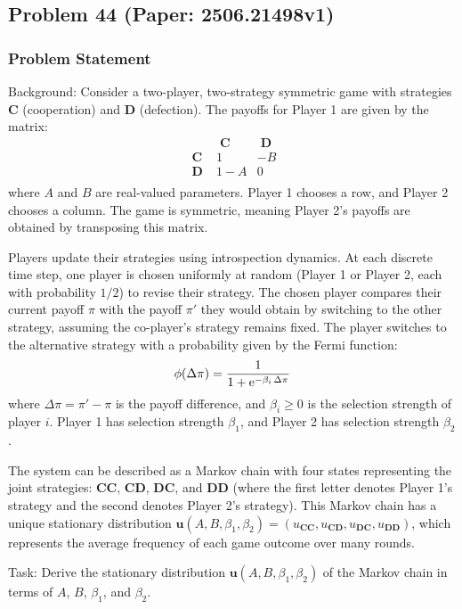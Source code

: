 \documentclass[10pt]{article}
\begin{document}
\subsection*{Problem 44 (Paper: 2506.21498v1)}
\subsubsection*{Problem Statement}
Background:
Consider a two-player, two-strategy symmetric game with strategies $\mathbf{C}$ (cooperation) and $\mathbf{D}$ (defection). The payoffs for Player 1 are given by the matrix:
$$
	\begin{array}{c|cc}
		&\mathbf{\;C\;} &\mathbf{\;D\;}\\
		\hline
		\mathbf{\;C\;} &1 &-B \\
		\mathbf{\;D\;} &1-A &0 \\
	\end{array}
$$
where $A$ and $B$ are real-valued parameters. Player 1 chooses a row, and Player 2 chooses a column. The game is symmetric, meaning Player 2's payoffs are obtained by transposing this matrix.

Players update their strategies using introspection dynamics. At each discrete time step, one player is chosen uniformly at random (Player 1 or Player 2, each with probability $1/2$) to revise their strategy. The chosen player compares their current payoff $\pi$ with the payoff $\pi'$ they would obtain by switching to the other strategy, assuming the co-player's strategy remains fixed. The player switches to the alternative strategy with a probability given by the Fermi function:
$$
\phi(\Delta\pi) = \frac{1}{1+{\rm e}^{-\beta_i\, \Delta\pi}}
$$
where $\Delta\pi = \pi' - \pi$ is the payoff difference, and $\beta_i \ge 0$ is the selection strength of player $i$. Player 1 has selection strength $\beta_1$, and Player 2 has selection strength $\beta_2$.

The system can be described as a Markov chain with four states representing the joint strategies: $\textbf{CC}$, $\textbf{CD}$, $\textbf{DC}$, and $\textbf{DD}$ (where the first letter denotes Player 1's strategy and the second denotes Player 2's strategy). This Markov chain has a unique stationary distribution $\mathbf{u}(A, B, \beta_1, \beta_2) = (u_{\textbf{CC}}, u_{\textbf{CD}}, u_{\textbf{DC}}, u_{\textbf{DD}})$, which represents the average frequency of each game outcome over many rounds.

Task:
Derive the stationary distribution $\mathbf{u}(A, B, \beta_1, \beta_2)$ of the Markov chain in terms of $A$, $B$, $\beta_1$, and $\beta_2$.
\end{document}
